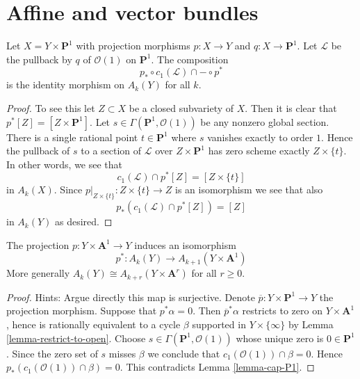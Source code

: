 \section{Affine and vector bundles}
\label{section-affine-vector}

\begin{lemma}
\label{lemma-cap-P1}
Let $X = Y \times \mathbf{P}^1$ with projection morphisms
$p : X \to Y$ and $q : X \to \mathbf{P}^1$.
Let $\mathcal{L}$ be the pullback by $q$ of $\mathcal{O}(1)$ on $\mathbf{P}^1$.
The composition
$$
p_* \circ c_1(\mathcal{L}) \cap - \circ p^*
$$
is the identity morphism on $A_k(Y)$ for all $k$.
\end{lemma}

\begin{proof}
To see this let
$Z \subset X$ be a closed subvariety of $X$. Then it is clear that
$p^*[Z] = [Z \times \mathbf{P}^1]$. Let
$s \in \Gamma(\mathbf{P}^1, \mathcal{O}(1))$ be any nonzero global
section. There is a single rational point $t \in \mathbf{P}^1$
where $s$ vanishes exactly to order $1$. Hence the pullback of
$s$ to a section of $\mathcal{L}$ over $Z \times \mathbf{P}^1$ has
zero scheme exactly $Z \times \{t\}$. In other words, we see that
$$
c_1(\mathcal{L}) \cap p^*[Z] = [Z \times \{t\}]
$$
in $A_k(X)$. Since $p|_{Z \times \{t\}} : Z \times \{t\} \to Z$
is an isomorphism we see that also
$$
p_*(c_1(\mathcal{L}) \cap p^*[Z]) = [Z]
$$
in $A_k(Y)$ as desired.
\end{proof}

\begin{lemma}
\label{lemma-affine-over-variety}
The projection $p : Y \times \mathbf{A}^1 \to Y$ induces an isomorphism
$$
p^* : A_k(Y) \to A_{k + 1}(Y \times \mathbf{A}^1)
$$
More generally $A_k(Y) \cong A_{k + r}(Y \times \mathbf{A}^r)$
for all $r \geq 0$.
\end{lemma}

\begin{proof}
Hints: Argue directly this map is surjective.
Denote $\overline{p} : Y \times \mathbf{P}^1 \to Y$ the projection
morphism. Suppose that $p^*\alpha = 0$. Then $\overline{p}^*\alpha$
restricts to zero on $Y \times \mathbf{A}^1$, hence is rationally
equivalent to a cycle $\beta$ supported in $Y \times \{\infty\}$ by
Lemma \ref{lemma-restrict-to-open}.
Choose $s \in \Gamma(\mathbf{P}^1, \mathcal{O}(1))$
whose unique zero is $0 \in \mathbf{P}^1$. Since the zero set of $s$
misses $\beta$ we conclude that $c_1(\mathcal{O}(1)) \cap \beta = 0$.
Hence $p_*(c_1(\mathcal{O}(1)) \cap \beta) = 0$. This contradicts
Lemma \ref{lemma-cap-P1}.
\end{proof}



